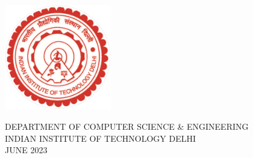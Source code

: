 \begin{titlepage}

\begin{center}


\LARGE
\MakeUppercase{\textbf{\ThesisTitle{}}}\\

\vspace{4cm}

\LARGE

\textbf{\Auth{}} 

\vspace{2.5cm}
\hspace{0cm}
\hbox{\includegraphics[width=11pc]{rest/iitd_logo.pdf}}
\vspace{1cm}

\large{DEPARTMENT OF COMPUTER SCIENCE \& ENGINEERING}\\
\large{INDIAN INSTITUTE OF TECHNOLOGY DELHI}\\
\large{JUNE 2023}\\

\end{center}

\end{titlepage}

